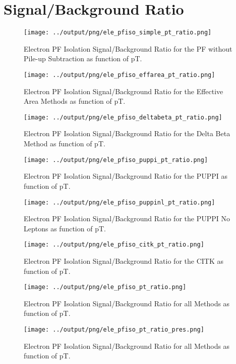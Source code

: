 \documentclass[11pt]{book}
\begin{document}
\chapter{Signal/Background Ratio}
\begin{figure}[htb]
\centering
\texttt{[image: ../output/png/ele\_pfiso\_simple\_pt\_ratio.png]}
\caption{Electron PF Isolation Signal/Background Ratio for the PF without Pile-up Subtraction as function of pT.}
\label{fig:ele_pfiso_pt_ratio_simple}
\end{figure}

\begin{figure}[htb]
\centering
\texttt{[image: ../output/png/ele\_pfiso\_effarea\_pt\_ratio.png]}
\caption{Electron PF Isolation Signal/Background Ratio for the Effective Area Methods as function of pT.}
\label{fig:ele_pfiso_pt_ratio_effarea}
\end{figure}

\begin{figure}[htb]
\centering
\texttt{[image: ../output/png/ele\_pfiso\_deltabeta\_pt\_ratio.png]}
\caption{Electron PF Isolation Signal/Background Ratio for the Delta Beta Method as function of pT.}
\label{fig:ele_pfiso_pt_ratio_deltabeta}
\end{figure}

\begin{figure}[htb]
\centering
\texttt{[image: ../output/png/ele\_pfiso\_puppi\_pt\_ratio.png]}
\caption{Electron PF Isolation Signal/Background Ratio for the PUPPI as function of pT.}
\label{fig:ele_pfiso_pt_ratio_puppi}
\end{figure}

\begin{figure}[htb]
\centering
\texttt{[image: ../output/png/ele\_pfiso\_puppinl\_pt\_ratio.png]}
\caption{Electron PF Isolation Signal/Background Ratio for the PUPPI No Leptons as function of pT.}
\label{fig:ele_pfiso_pt_ratio_puppinl}
\end{figure}

\begin{figure}[htb]
\centering
\texttt{[image: ../output/png/ele\_pfiso\_citk\_pt\_ratio.png]}
\caption{Electron PF Isolation Signal/Background Ratio for the CITK as function of pT.}
\label{fig:ele_pfiso_pt_ratio_citk}
\end{figure}


\begin{figure}[htb]
\centering
\texttt{[image: ../output/png/ele\_pfiso\_pt\_ratio.png]}
\caption{Electron PF Isolation Signal/Background Ratio for all Methods as function of pT.}
\label{fig:ele_pfiso_pt_ratio}
\end{figure}

\begin{figure}[htb]
\centering
\texttt{[image: ../output/png/ele\_pfiso\_pt\_ratio\_pres.png]}
\caption{Electron PF Isolation Signal/Background Ratio for all Methods as function of pT.}
\label{fig:ele_pfiso_pt_ratio_pres}
\end{figure}
\clearpage
\end{document}

